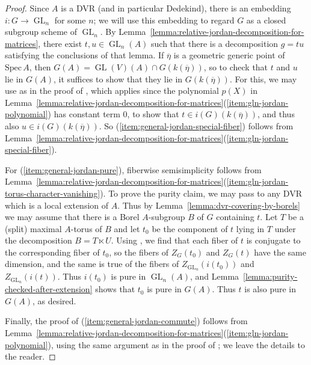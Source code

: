 \documentclass[11pt,reqno]{amsart}
\theoremstyle{definition}
\newcommand{\Spec}{\mathrm{Spec} \,}
\DeclareMathOperator{\GL}{GL}
\begin{document}
\begin{proof}
Since $A$ is a DVR (and in particular Dedekind), there is an embedding $i: G \to \GL_n$ for some $n$; we will use this embedding to regard $G$ as a closed subgroup scheme of $\GL_n$. By Lemma~\ref{lemma:relative-jordan-decomposition-for-matrices}, there exist $t, u \in \GL_n(A)$ such that there is a decomposition $g = tu$ satisfying the conclusions of that lemma. If $\overline{\eta}$ is a geometric generic point of $\Spec A$, then $G(A) = \GL(V)(A) \cap G(k(\overline{\eta}))$, so to check that $t$ and $u$ lie in $G(A)$, it suffices to show that they lie in $G(k(\overline{\eta}))$. For this, we may use \cite[3.8, Cor.]{Borel} as in the proof of \cite[4.4, Thm.(1)]{Borel}, which applies since the polynomial $p(X)$ in Lemma~\ref{lemma:relative-jordan-decomposition-for-matrices}(\ref{item:gln-jordan-polynomial}) has constant term $0$, to show that $t \in i(G)(k(\overline{\eta}))$, and thus also $u \in i(G)(k(\overline{\eta}))$. So (\ref{item:general-jordan-special-fiber}) follows from Lemma~\ref{lemma:relative-jordan-decomposition-for-matrices}(\ref{item:gln-jordan-special-fiber}). \smallskip

For (\ref{item:general-jordan-pure}), fiberwise semisimplicity follows from Lemma~\ref{lemma:relative-jordan-decomposition-for-matrices}(\ref{item:gln-jordan-torus-character-vanishing}). To prove the purity claim, we may pass to any DVR which is a local extension of $A$. Thus by Lemma~\ref{lemma:dvr-covering-by-borels} we may assume that there is a Borel $A$-subgroup $B$ of $G$ containing $t$. Let $T$ be a (split) maximal $A$-torus of $B$ and let $t_0$ be the component of $t$ lying in $T$ under the decomposition $B = T \ltimes U$. Using \cite[Lem.\ 2.12]{SteinbergReg}, we find that each fiber of $t$ is conjugate to the corresponding fiber of $t_0$, so the fibers of $Z_G(t_0)$ and $Z_G(t)$ have the same dimension, and the same is true of the fibers of $Z_{\GL_n}(i(t_0))$ and $Z_{\GL_n}(i(t))$. Thus $i(t_0)$ is pure in $\GL_n(A)$, and Lemma~\ref{lemma:purity-checked-after-extension} shows that $t_0$ is pure in $G(A)$. Thus $t$ is also pure in $G(A)$, as desired. \smallskip

Finally, the proof of (\ref{item:general-jordan-commute}) follows from Lemma~\ref{lemma:relative-jordan-decomposition-for-matrices}(\ref{item:gln-jordan-polynomial}), using the same argument as in the proof of \cite[Lem.\ 2.6]{Integral-Springer}; we leave the details to the reader.
\end{proof}
\end{document}

